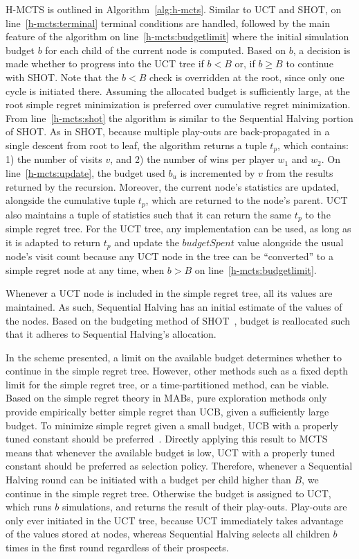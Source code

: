 \documentclass[a4paper]{llncs}
\begin{document}
H-MCTS is outlined in Algorithm~\ref{alg:h-mcts}. Similar to UCT and SHOT, on line~\ref{h-mcts:terminal} terminal conditions are handled, followed by the main feature of the algorithm on line~\ref{h-mcts:budgetlimit} where the initial simulation budget $b$ for each child of the current node is computed. Based on $b$, a decision is made whether to progress into the UCT tree if $b<B$ or, if $b \geq B$ to continue with SHOT. Note that the $b<B$ check is overridden at the root, since only one cycle is initiated there. Assuming the allocated budget is sufficiently large, at the root simple regret minimization is preferred over cumulative regret minimization. From line~\ref{h-mcts:shot} the algorithm is similar to the Sequential Halving portion of SHOT. As in SHOT, because multiple play-outs are back-propagated in a single descent from root to leaf, the algorithm returns a tuple $t_p$, which contains: 1) the number of visits $v$, and 2) the number of wins per player $w_1$ and $w_2$. On line~\ref{h-mcts:update}, the budget used $b_u$ is incremented by $v$ from the results returned by the recursion. Moreover, the current node's statistics are updated, alongside the cumulative tuple $t_p$, which are returned to the node's parent. UCT also maintains a tuple of statistics such that it can return the same $t_p$ to the simple regret tree. For the UCT tree, any implementation can be used, as long as it is adapted to return $t_p$ and update the $budgetSpent$ value alongside the usual node's visit count because any UCT node in the tree can be ``converted'' to a simple regret node at any time, when $b>B$ on line~\ref{h-mcts:budgetlimit}. 

Whenever a UCT node is included in the simple regret tree, all its values are maintained. As such, Sequential Halving has an initial estimate of the values of the nodes. Based on the budgeting method of SHOT~\cite{Cazenave14SHOT}, budget is reallocated such that it adheres to Sequential Halving's allocation. 

In the scheme presented, a limit on the available budget determines whether to continue in the simple regret tree. However, other methods such as a fixed depth limit for the simple regret tree, or a time-partitioned method, can be viable. Based on the simple regret theory in MABs, pure exploration methods only provide empirically better simple regret than UCB, given a sufficiently large budget. To minimize simple regret given a small budget, UCB with a properly tuned constant should be preferred~\cite{Bubeck11Pure}. Directly applying this result to MCTS means that whenever the available budget is low, UCT with a properly tuned constant should be preferred as selection policy. Therefore, whenever a Sequential Halving round can be initiated with a budget per child higher than $B$, we continue in the simple regret tree. Otherwise the budget is assigned to UCT, which runs $b$ simulations, and returns the result of their play-outs. Play-outs are only ever initiated in the UCT tree, because UCT immediately takes advantage of the values stored at nodes, whereas Sequential Halving selects all children $b$ times in the first round regardless of their prospects.
\end{document}
